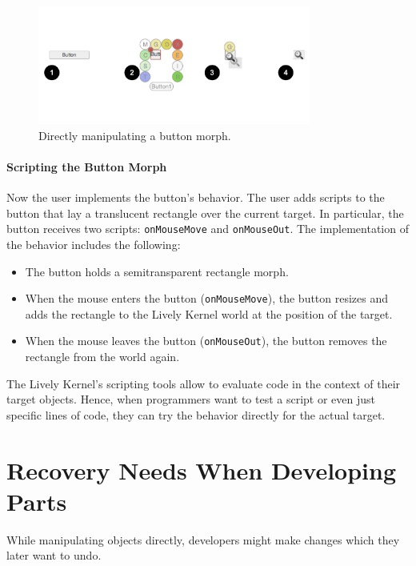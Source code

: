 \begin{figure}[h]
    \centering
    \includegraphics[width=0.8\textwidth]{figures/3_motivation/3_buildingTheButton.pdf}
    \caption{Directly manipulating a button morph.}
    \label{fig:ButtonBuilding}
\end{figure}

\paragraph{Scripting the Button Morph}
Now the user implements the button's behavior.
The user adds scripts to the button that lay a translucent rectangle over the current target.
In particular, the button receives two scripts: \lstinline{onMouseMove} and \lstinline{onMouseOut}.
The implementation of the behavior includes the following: 
\begin{itemize}
    \item The button holds a semitransparent rectangle morph.
    \item When the mouse enters the button (\lstinline{onMouseMove}), the button resizes and adds the rectangle to the Lively Kernel world at the position of the target.
    \item When the mouse leaves the button (\lstinline{onMouseOut}), the button removes the rectangle from the world again.
\end{itemize}
 
The Lively Kernel's scripting tools allow to evaluate code in the context of their target objects.
Hence, when programmers want to test a script or even just specific lines of code, they can try the behavior directly for the actual target.


\section{Recovery Needs When Developing Parts}

While manipulating objects directly, developers might make changes which they later want to undo.

